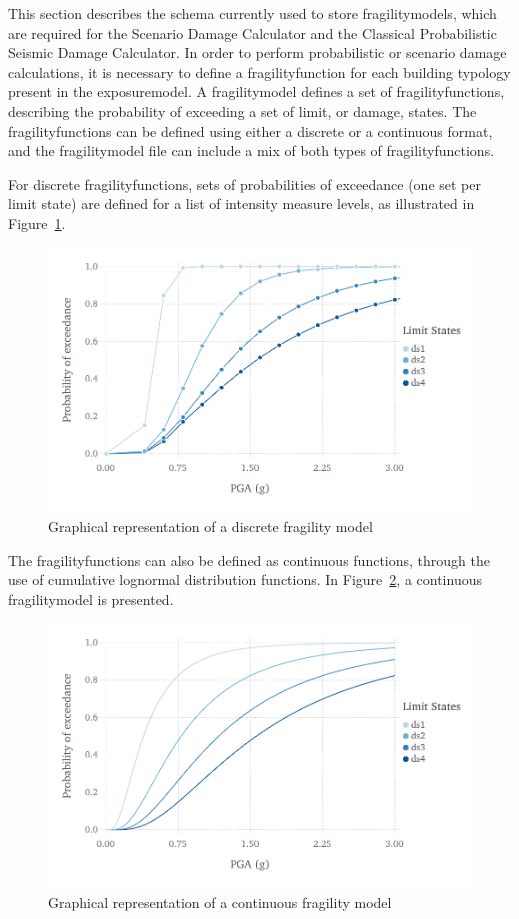 This section describes the schema currently used to store
\glspl{fragilitymodel}, which are required for the Scenario Damage Calculator
and the Classical Probabilistic Seismic Damage Calculator. In order to perform
probabilistic or scenario damage calculations, it is necessary to define a
\gls{fragilityfunction} for each building typology present in the
\gls{exposuremodel}. A \gls{fragilitymodel} defines a set of
\glspl{fragilityfunction}, describing the probability of exceeding a set of
limit, or damage, states. The \glspl{fragilityfunction} can be defined using
either a discrete or a continuous format, and the \gls{fragilitymodel} file
can include a mix of both types of \glspl{fragilityfunction}.

For discrete \glspl{fragilityfunction}, sets of probabilities of exceedance
(one set per limit state) are defined for a list of intensity measure levels,
as illustrated in Figure~\ref{fig:fragility-discrete}.

\begin{figure}[ht]
\centering
\includegraphics[width=12cm]{figures/risk/fragility-discrete.pdf}
\caption{Graphical representation of a discrete fragility model}
\label{fig:fragility-discrete}
\end{figure}

The \glspl{fragilityfunction} can also be defined as continuous functions,
through the use of cumulative lognormal distribution functions. In
Figure~\ref{fig:fragility-continuous}, a continuous \gls{fragilitymodel} is
presented.

\begin{figure}[ht]
\centering
\includegraphics[width=12cm]{figures/risk/fragility-continuous.pdf}
\caption{Graphical representation of a continuous fragility model}
\label{fig:fragility-continuous}
\end{figure}

